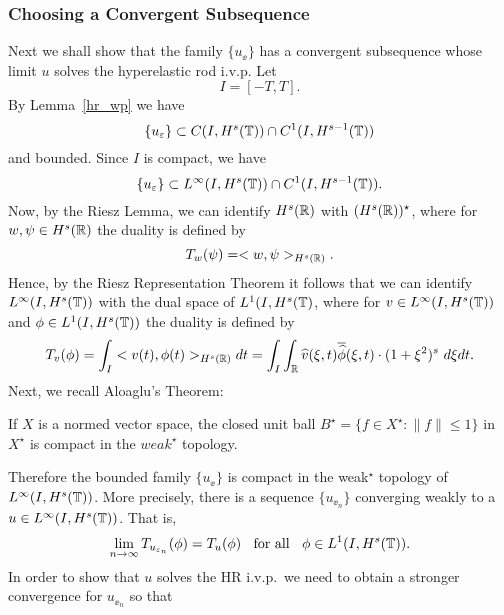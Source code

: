 \subsubsection{Choosing  a Convergent Subsequence}
%
Next we shall show that  the family $\{ u_\ee\}$ has a convergent subsequence
whose limit $u$ solves the hyperelastic rod i.v.p. 
Let
$$
I= [-T, T].
$$
By Lemma~\ref{hr_wp} we have 
%
\begin{equation}
\label{C-1-fam}
\{u_\varepsilon\}\subset C(I, H^s(\mathbb{T}))\cap C^1(I, H^{s-1}(\mathbb{T}))
\end{equation}
%
and bounded. Since $I$ is compact, we have  
%
\begin{equation}
\label{Lip-1-fam}
\{u_\varepsilon\}\subset L^{\infty}(I, H^s(\mathbb{T}))\cap C^1(I,
H^{s-1}(\mathbb{T})).
\end{equation}
%
Now, by the Riesz Lemma, we can identify $H^s(\mathbb{R})$ with
$(H^s(\mathbb{R}))^{\star}$, where for $w, \psi \in H^s(\mathbb{R})$ the duality is
defined by 
\begin{equation*}
T_w(\psi) = <w, \psi>_{H^s(\mathbb{R})}.
\end{equation*}
Hence, by the Riesz Representation Theorem it follows that we can
identify \\ $L^\infty(I, H^s(\mathbb{T})) $ with the dual space of $L^1(I,
H^{s}(\mathbb{T})$, where for $v\in L^\infty(I, H^s(\mathbb{T})) $ and $ \phi \in
L^1(I, H^{s}(\mathbb{T}))$ the duality is defined by  
%
\begin{equation}
T_v(\phi) = \int_I <v (t), \phi (t)>_{H^s(\mathbb{R})} dt  = \int_I
\int_{\mathbb{R}}
\widehat{v}(\xi, t) \overline{\widehat{\phi}}(\xi, t) \cdot (1
+ \xi^2)^s \ d \xi dt.
\end{equation}
%
Next, we recall Aloaglu's Theorem:
\begin{theorem}
If $X$ is a normed vector space,
the closed unit ball $B^{\star} = \{f \in X^{\star} : \|f\| \le
1\}$ in $X^{\star}$ is compact in the $weak^{\star}$ topology.
\end{theorem}
Therefore the bounded family $\{u_\ee\}$ is compact 
in the weak$^{\star}$ topology of \\
$L^\infty(I, H^s(\mathbb{T}))$. More precisely,
there is a sequence  $\{ u_{\ee_n} \}$ converging
weakly to a $ u\in L^{\infty}(I, H^s(\mathbb{T}))$.
That is,
%
\begin{equation}
\label{weak-conv}
\lim_{n\to \infty} T_{u_{\varepsilon_n}}(\phi)  =  T_u (\phi) 
\; \; \ 		
\text{for all} \ \;\;  \phi \in L^1(I, H^{s}(\mathbb{T})).
\end{equation}
%
In order to show that  $u$ solves the HR i.v.p.\ we need to 
obtain a stronger  convergence for  $u_{\ee_n}$ so that 
